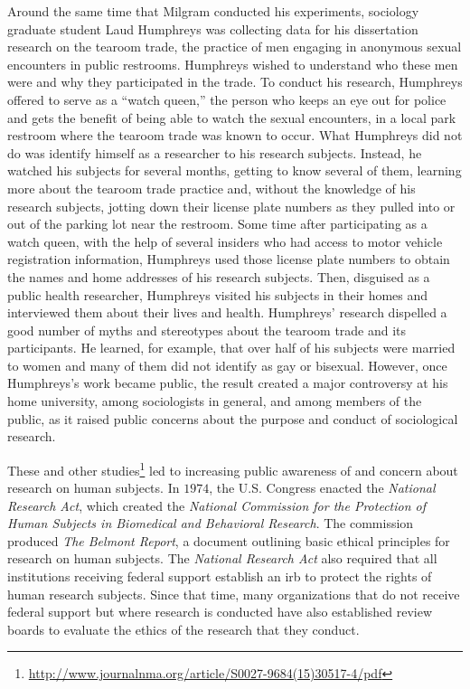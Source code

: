 Around the same time that Milgram conducted his experiments, sociology graduate student Laud Humphreys\cite{humphreys1970tearoom} was collecting data for his dissertation research on the tearoom trade, the practice of men engaging in anonymous sexual encounters in public restrooms. Humphreys wished to understand who these men were and why they participated in the trade. To conduct his research, Humphreys offered to serve as a ``watch queen,'' the person who keeps an eye out for police and gets the benefit of being able to watch the sexual encounters, in a local park restroom where the tearoom trade was known to occur. What Humphreys did not do was identify himself as a researcher to his research subjects. Instead, he watched his subjects for several months, getting to know several of them, learning more about the tearoom trade practice and, without the knowledge of his research subjects, jotting down their license plate numbers as they pulled into or out of the parking lot near the restroom. Some time after participating as a watch queen, with the help of several insiders who had access to motor vehicle registration information, Humphreys used those license plate numbers to obtain the names and home addresses of his research subjects. Then, disguised as a public health researcher, Humphreys visited his subjects in their homes and interviewed them about their lives and health. Humphreys' research dispelled a good number of myths and stereotypes about the tearoom trade and its participants. He learned, for example, that over half of his subjects were married to women and many of them did not identify as gay or bisexual. However, once Humphreys’s work became public, the result created a major controversy at his home university, among sociologists in general, and among members of the public, as it raised public concerns about the purpose and conduct of sociological research.

These and other studies\footnote{\url{http://www.journalnma.org/article/S0027-9684(15)30517-4/pdf}} led to increasing public awareness of and concern about research on human subjects. In $ 1974 $, the U.S. Congress enacted the \textit{National Research Act}, which created the \textit{National Commission for the Protection of Human Subjects in Biomedical and Behavioral Research}. The commission produced \textit{The Belmont Report}\cite{national1978belmont}, a document outlining basic ethical principles for research on human subjects. The \textit{National Research Act} also required that all institutions receiving federal support establish an \gls{irb} to protect the rights of human research subjects. Since that time, many organizations that do not receive federal support but where research is conducted have also established review boards to evaluate the ethics of the research that they conduct.

